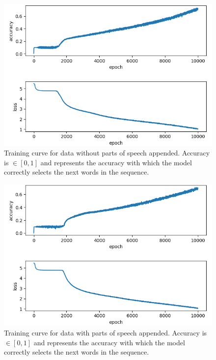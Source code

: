 \documentclass[conference]{IEEEtran}
\begin{document}
\begin{figure}[ht]
\caption{Training curve for data without parts of speech appended. Accuracy is $\in[0,1]$ and represents the accuracy with which the model correctly selects the next words in the sequence.}
\label{fig:curve_without_pos}
\centering
\vspace{2mm}
\includegraphics[scale=0.5]{training_curve_without_pos}
\end{figure}

\begin{figure}[ht]
\caption{Training curve for data with parts of speech appended. Accuracy is $\in[0,1]$ and represents the accuracy with which the model correctly selects the next words in the sequence.}
\label{fig:curve_with_pos}
\centering
\vspace{2mm}
\includegraphics[scale=0.5]{training_curve_with_pos}
\end{figure}
\end{document}
